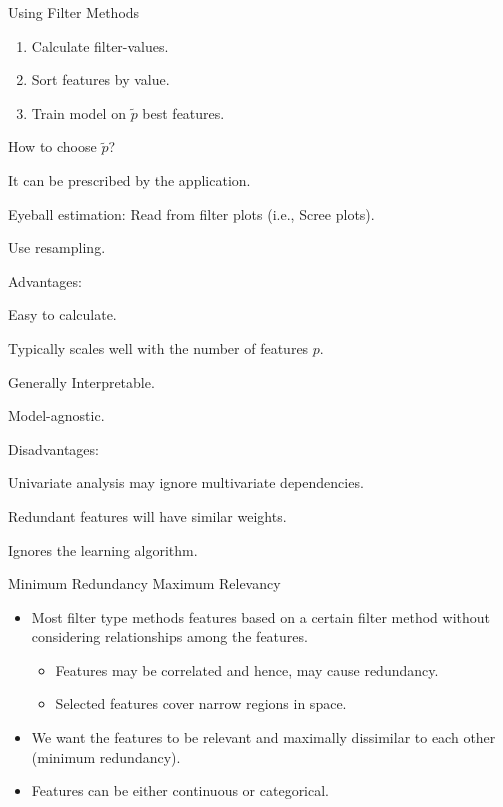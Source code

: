 \documentclass[11pt,compress,t,notes=noshow, xcolor=table]{beamer}
\begin{document}
  \begin{vbframe}{Using Filter Methods}

  \begin{enumerate}{}
    \item Calculate filter-values.
    \item Sort features by value.
    \item Train model on $\tilde{p}$ best features.
  \end{enumerate}

  \lz

  \begin{blocki}{How to choose $\tilde{p}$?}
    \item It can be prescribed by the application.
    \item Eyeball estimation: Read from filter plots (i.e., Scree plots).
    \item Use resampling.
  \end{blocki}

  \framebreak

  \begin{blocki}{Advantages:}
    \item Easy to calculate.
    \item Typically scales well with the number of features $p$.
    \item Generally Interpretable.
    \item Model-agnostic.
  \end{blocki}

  \begin{blocki}{Disadvantages:}
    \item Univariate analysis may ignore multivariate dependencies.
    \item Redundant features will have similar weights.
    \item Ignores the learning algorithm.
  \end{blocki}
  \end{vbframe}

  \begin{vbframe}{Minimum Redundancy Maximum Relevancy}
  \begin{itemize}
    \setlength{\itemsep}{1.0em}
    \item Most filter type methods features based on a certain filter method  without considering relationships among the features.
    \begin{itemize}
      \item Features may be correlated and hence, may cause redundancy.
      \item Selected features cover narrow regions in space.
    \end{itemize}
    \item We want the features to be relevant and maximally dissimilar to each other (minimum redundancy).
    \item Features can be either continuous or categorical.
  \end{itemize}
  \end{vbframe}
\end{document}
